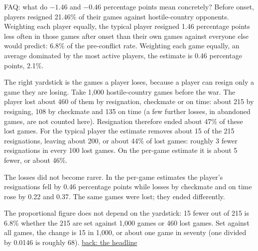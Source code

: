 \documentclass[aspectratio=169,11pt,t]{beamer}
\newcommand{\backto}[2]{\vfill\hfill\hyperlink{#1}{\textcolor{linkblue}{\scriptsize\textsf{back: #2}}}}
\begin{document}
\begin{frame}[label=faq-magnitude]{FAQ: what do $-1.46$ and $-0.46$ percentage points mean concretely?}
  \footnotesize
  Before onset, players resigned 21.46\% of their games against hostile-country opponents. Weighting each player equally, the typical player resigned 1.46 percentage points less often in those games after onset than their own games against everyone else would predict: 6.8\% of the pre-conflict rate. Weighting each game equally, an average dominated by the most active players, the estimate is 0.46 percentage points, 2.1\%.

  The right yardstick is the games a player loses, because a player can resign only a game they are losing. Take 1,000 hostile-country games before the war. The player lost about 460 of them by resignation, checkmate or on time: about 215 by resigning, 108 by checkmate and 135 on time (a few further losses, in abandoned games, are not counted here). Resignation therefore ended about 47\% of these lost games. For the typical player the estimate removes about 15 of the 215 resignations, leaving about 200, or about 44\% of lost games: roughly 3 fewer resignations in every 100 lost games. On the per-game estimate it is about 5 fewer, or about 46\%.

  The losses did not become rarer. In the per-game estimates the player's resignations fell by 0.46 percentage points while losses by checkmate and on time rose by 0.22 and 0.37. The same games were lost; they ended differently.

  The proportional figure does not depend on the yardstick: 15 fewer out of 215 is 6.8\% whether the 215 are set against 1,000 games or 460 lost games. Set against all games, the change is 15 in 1,000, or about one game in seventy (one divided by 0.0146 is roughly 68).
  \backto{headline}{the headline}
\end{frame}
\end{document}
